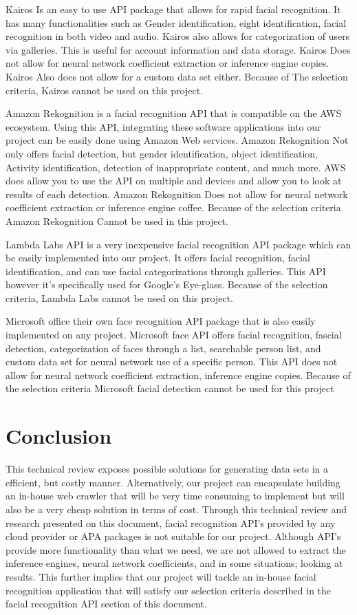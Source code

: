 \documentclass[onecolumn, draftclsnofoot,10pt, compsoc]{IEEEtran}
\begin{document}
    Kairos Is an easy to use API package that allows for rapid facial recognition. It has many functionalities such as Gender identification, eight identification, facial recognition in both video and audio. Kairos also allows for categorization of users via galleries. This is useful for account information and data storage. Kairos Does not allow for neural network coefficient extraction or inference engine copies. Kairos Also does not allow for a custom data set either. Because of The selection criteria, Kairos cannot be used on this project.

    Amazon Rekognition is a facial recognition API that is compatible on the AWS ecosystem. Using this API, integrating these software applications into our project can be easily done using Amazon Web services. Amazon Rekognition Not only offers facial detection, but gender identification, object identification, Activity identification, detection of inappropriate content, and much more. AWS does allow you to use the API on multiple and devices and allow you to look at results of each detection. Amazon Rekognition Does not allow for neural network coefficient extraction or inference engine coffee. Because of the selection criteria Amazon Rekognition Cannot be used in this project.

    Lambda Labs API is a very inexpensive facial recognition API package which can be easily implemented into our project. It offers facial recognition, facial identification, and can use facial categorizations through galleries. This API however it’s specifically used for Google’s Eye-glass. Because of the selection criteria, Lambda Labs cannot be used on this project.

    Microsoft office their own face recognition API package that is also easily implemented on any project. Microsoft face API offers facial recognition, fascial detection, categorization of faces through a list, searchable person list, and custom data set for neural network use of a specific person. This API does not allow for neural network coefficient extraction, inference engine copies. Because of the selection criteria Microsoft facial detection cannot be used for this project

    \section{Conclusion}
    This technical review exposes possible solutions for generating data sets in a efficient, but costly manner. Alternatively, our project can encapsulate building an in-house web crawler that will be very time consuming to implement but will also be a very cheap solution in terms of cost. Through this technical review and research presented on this document, facial recognition API’s provided by any cloud provider or APA packages is not suitable for our project. Although API’s provide more functionality than what we need, we are not allowed to extract the inference engines, neural network coefficients, and in some situations; looking at results.  This further implies that our project will tackle an in-house facial recognition application that will satisfy our selection criteria described in the facial recognition API section of this document. 
\end{document}
